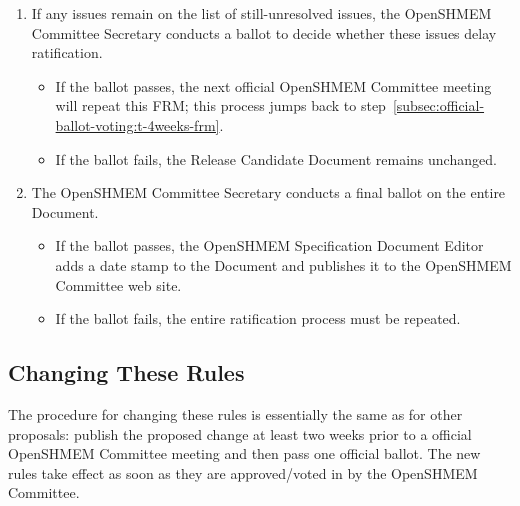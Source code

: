 \begin{enumerate}
\begin{enumerate}
    \item If any issues remain on the list of still-unresolved issues,
      the OpenSHMEM Committee Secretary conducts a ballot to decide whether
      these issues delay ratification.
      \begin{itemize}
      \item If the ballot passes, the next official OpenSHMEM Committee meeting
        will repeat this FRM; this process jumps back to
        step~\ref{subsec:official-ballot-voting:t-4weeks-frm}.
      \item If the ballot fails, the Release Candidate Document
        remains unchanged.
      \end{itemize}
    \item The OpenSHMEM Committee Secretary conducts a final ballot on the
      entire Document.
      \begin{itemize}
      \item If the ballot passes, the OpenSHMEM Specification Document Editor adds
        a date stamp to the Document and publishes it to the OpenSHMEM Committee
        web site.
      \item If the ballot fails, the entire ratification process must be
        repeated.
      \end{itemize}
  \end{enumerate}
\end{enumerate}


\subsection{Changing These Rules}

The procedure for changing these rules is essentially the same as for
other proposals: publish the proposed change at least two weeks prior
to a official OpenSHMEM Committee meeting and then pass one official ballot.
The new rules take effect as soon as they are approved/voted in by the
OpenSHMEM Committee.

